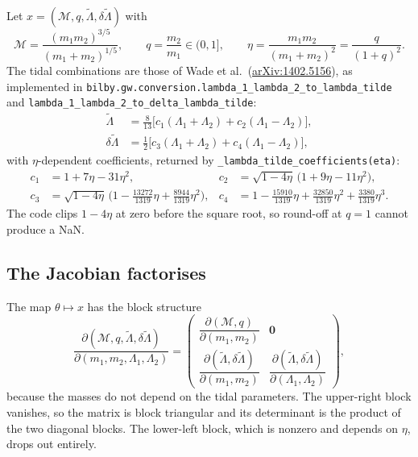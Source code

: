 \documentclass[11pt,a4paper]{article}
\newcommand{\Mc}{\mathcal{M}}
\newcommand{\lt}{\tilde{\Lambda}}
\newcommand{\dlt}{\delta\tilde{\Lambda}}
\newcommand{\code}[1]{\texttt{#1}}
\begin{document}
Let $x = (\Mc, q, \lt, \dlt)$ with
\begin{equation}
  \Mc = \frac{(m_1 m_2)^{3/5}}{(m_1+m_2)^{1/5}},
  \qquad
  q = \frac{m_2}{m_1} \in (0, 1],
  \qquad
  \eta = \frac{m_1 m_2}{(m_1+m_2)^2} = \frac{q}{(1+q)^2}.
\end{equation}
The tidal combinations are those of Wade et al.\
(\href{https://arxiv.org/abs/1402.5156}{arXiv:1402.5156}), as implemented in
\code{bilby.gw.conversion.lambda\_1\_lambda\_2\_to\_lambda\_tilde} and
\code{lambda\_1\_lambda\_2\_to\_delta\_lambda\_tilde}:
\begin{align}
  \lt  &= \tfrac{8}{13}\Big[ c_1 (\Lambda_1 + \Lambda_2) + c_2 (\Lambda_1 - \Lambda_2) \Big], \\
  \dlt &= \tfrac{1}{2}\Big[ c_3 (\Lambda_1 + \Lambda_2) + c_4 (\Lambda_1 - \Lambda_2) \Big],
\end{align}
with $\eta$-dependent coefficients, returned by
\code{\_lambda\_tilde\_coefficients(eta)}:
\begin{align}
  c_1 &= 1 + 7\eta - 31\eta^2, &
  c_2 &= \sqrt{1-4\eta}\,\big(1 + 9\eta - 11\eta^2\big), \nonumber\\
  c_3 &= \sqrt{1-4\eta}\,\Big(1 - \tfrac{13272}{1319}\eta + \tfrac{8944}{1319}\eta^2\Big), &
  c_4 &= 1 - \tfrac{15910}{1319}\eta + \tfrac{32850}{1319}\eta^2 + \tfrac{3380}{1319}\eta^3 .
  \label{eq:coeffs}
\end{align}
The code clips $1-4\eta$ at zero before the square root, so round-off at
$q = 1$ cannot produce a NaN.

\subsection{The Jacobian factorises}

The map $\theta \mapsto x$ has the block structure
\begin{equation}
  \frac{\partial(\Mc, q, \lt, \dlt)}{\partial(m_1, m_2, \Lambda_1, \Lambda_2)}
  =
  \begin{pmatrix}
    \dfrac{\partial(\Mc, q)}{\partial(m_1, m_2)} & \mathbf{0} \\[2ex]
    \dfrac{\partial(\lt, \dlt)}{\partial(m_1, m_2)} &
    \dfrac{\partial(\lt, \dlt)}{\partial(\Lambda_1, \Lambda_2)}
  \end{pmatrix},
\end{equation}
because the masses do not depend on the tidal parameters. The upper-right block
vanishes, so the matrix is block triangular and its determinant is the product
of the two diagonal blocks. The lower-left block, which is nonzero and depends
on $\eta$, drops out entirely.
\end{document}
